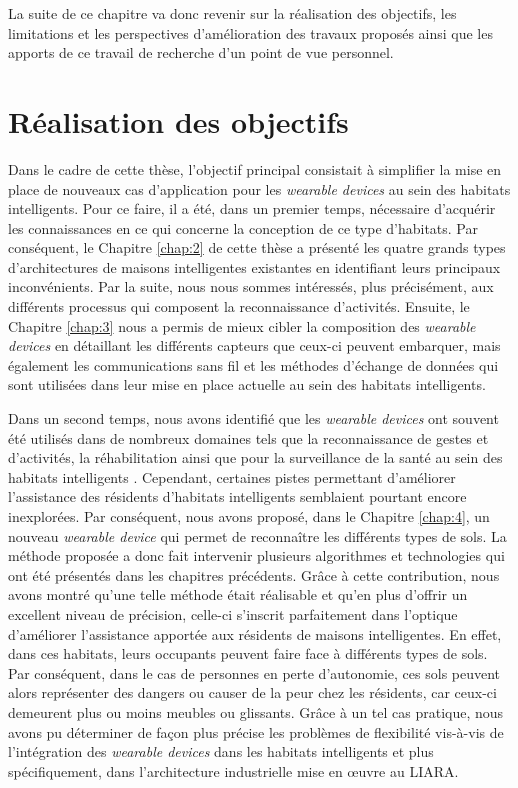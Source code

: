 La suite de ce chapitre va donc revenir sur la réalisation des objectifs, les limitations et les perspectives d'amélioration des travaux proposés ainsi que les apports de ce travail de recherche d'un point de vue personnel.

\section{Réalisation des objectifs}

Dans le cadre de cette thèse, l'objectif principal consistait à simplifier la mise en place de nouveaux cas d'application pour les \textit{wearable devices} au sein des habitats intelligents. Pour ce faire, il a été, dans un premier temps, nécessaire d'acquérir les connaissances en ce qui concerne la conception de ce type d'habitats. Par conséquent, le Chapitre \ref{chap:2} de cette thèse a présenté les quatre grands types d'architectures de maisons intelligentes existantes en identifiant leurs principaux inconvénients. Par la suite, nous nous sommes intéressés, plus précisément, aux différents processus qui composent la reconnaissance d'activités. Ensuite, le Chapitre \ref{chap:3} nous a permis de mieux cibler la composition des \textit{wearable devices} en détaillant les différents capteurs que ceux-ci peuvent embarquer, mais également les communications sans fil et les méthodes d'échange de données qui sont utilisées dans leur mise en place actuelle au sein des habitats intelligents.

Dans un second temps, nous avons identifié que les \textit{wearable devices} ont souvent été utilisés dans de nombreux domaines tels que la reconnaissance de gestes et d'activités, la réhabilitation ainsi que pour la surveillance de la santé au sein des habitats intelligents \citep{Khan2016,Davis2016,Chapron2018}. Cependant, certaines pistes permettant d'améliorer l'assistance des résidents d'habitats intelligents semblaient pourtant encore inexplorées. Par conséquent, nous avons proposé, dans le Chapitre \ref{chap:4}, un nouveau \textit{wearable device} qui permet de reconnaître les différents types de sols. La méthode proposée a donc fait intervenir plusieurs algorithmes et technologies qui ont été présentés dans les chapitres précédents. Grâce à cette contribution, nous avons montré qu'une telle méthode était réalisable et qu'en plus d'offrir un excellent niveau de précision, celle-ci s'inscrit parfaitement dans l'optique d'améliorer l'assistance apportée aux résidents de maisons intelligentes. En effet, dans ces habitats, leurs occupants peuvent faire face à différents types de sols. Par conséquent, dans le cas de personnes en perte d'autonomie, ces sols peuvent alors représenter des dangers ou causer de la peur chez les résidents, car ceux-ci demeurent plus ou moins meubles ou glissants. Grâce à un tel cas pratique, nous avons pu déterminer de façon plus précise les problèmes de flexibilité vis-à-vis de l'intégration des \textit{wearable devices} dans les habitats intelligents et plus spécifiquement, dans l'architecture industrielle mise en \oe{}uvre au \acs{LIARA}.

